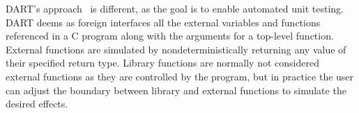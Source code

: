 {%
}

{\sc DART}'s approach~\cite{DART-PLDI05} is different, as the goal is to enable automated unit testing. DART deems as foreign interfaces all the external variables and functions referenced in a C program along with the arguments for a top-level function.
External functions are simulated by nondeterministically returning any value of their specified return type. Library functions are normally not considered external functions as they are controlled by the program, but in practice the user can adjust the boundary between library and external functions to simulate the desired effects.


